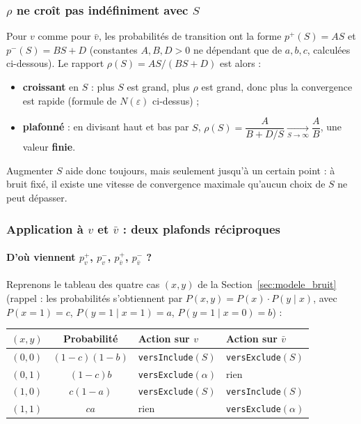 \documentclass[12pt,a4paper]{article}
\theoremstyle{remark}
\newcommand{\vbar}{\bar{v}}
\begin{document}
\subsubsection*{$\rho$ ne croît pas indéfiniment avec $S$}

Pour $v$ comme pour $\vbar$, les probabilités de transition ont la forme
$p^+(S)=AS$ et $p^-(S)=BS+D$ (constantes $A,B,D>0$ ne dépendant que de $a,b,c$,
calculées ci-dessous). Le rapport $\rho(S)=AS/(BS+D)$ est alors :
\begin{itemize}
  \item \textbf{croissant} en $S$ : plus $S$ est grand, plus $\rho$ est grand,
  donc plus la convergence est rapide (formule de $N(\varepsilon)$ ci-dessus) ;
  \item \textbf{plafonné} : en divisant haut et bas par $S$,
  $\rho(S)=\dfrac{A}{B+D/S} \xrightarrow[S\to\infty]{} \dfrac{A}{B}$, une valeur
  \textbf{finie}.
\end{itemize}
Augmenter $S$ aide donc toujours, mais seulement jusqu'à un certain point : à bruit
fixé, il existe une vitesse de convergence maximale qu'aucun choix de $S$ ne peut
dépasser.

\subsubsection*{Application à $v$ et $\vbar$ : deux plafonds réciproques}

\paragraph{D'où viennent $p^+_v$, $p^-_v$, $p^+_{\vbar}$, $p^-_{\vbar}$ ?}
Reprenons le tableau des quatre cas $(x,y)$ de la Section~\ref{sec:modele_bruit} (rappel :
les probabilités s'obtiennent par $P(x,y)=P(x)\cdot P(y\mid x)$, avec $P(x{=}1)=c$,
$P(y{=}1\mid x{=}1)=a$, $P(y{=}1\mid x{=}0)=b$) :

\begin{center}
\renewcommand{\arraystretch}{1.3}
\begin{tabular}{ccll}
\toprule
$(x,y)$ & Probabilité & Action sur $v$ & Action sur $\vbar$ \\
\midrule
$(0,0)$ & $(1-c)(1-b)$  & \texttt{versInclude}$(S)$ & \texttt{versExclude}$(S)$ \\
$(0,1)$ & $(1-c)b$      & \texttt{versExclude}$(\alpha)$ & rien \\
$(1,0)$ & $c(1-a)$     & \texttt{versExclude}$(S)$ & \texttt{versInclude}$(S)$ \\
$(1,1)$ & $ca$         & rien & \texttt{versExclude}$(\alpha)$ \\
\bottomrule
\end{tabular}
\end{center}
\end{document}
